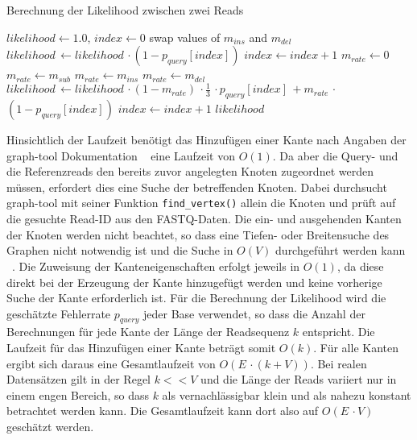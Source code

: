 \begin{algorithm}[H]
	\caption{Berechnung der Likelihood zwischen zwei Reads}  \label{alg:lh_read}
	\begin{algorithmic}[1]	
		\State $ likelihood \gets 1.0 $, $ index \gets 0 $
		    \State swap values of $ m_{ins} $ and $ m_{del} $
	    \EndIf
		        \State $ likelihood\, \gets likelihood \,\cdotp (1-p_{query}[index]) $
		    	\State $ index \gets index + 1 $
		    \EndWhile
	    \EndIf
	        \State $ m_{rate} \gets 0 $
	            \State $ m_{rate} \gets m_{sub} $
	        \EndIf
	            \State $ m_{rate} \gets m_{ins} $
	        \EndIf
	            \State $ m_{rate} \gets m_{del} $
	        \EndIf
		        \State $ likelihood\, \gets likelihood \,\cdotp (1 - m_{rate})\,\cdotp \frac{1}{3} \,\cdotp p_{query}[index] \, +  m_{rate}\,\cdotp $         
		         \State \hspace{63pt}  $ (1 - p_{query}[index]) $ 		        
		        \State $ index \gets index + 1 $
	        \EndWhile
	    \EndIf
		\EndFor
		\State \Return $likelihood$
		\EndFunction		
	\end{algorithmic}
\end{algorithm}

Hinsichtlich der Laufzeit benötigt das Hinzufügen einer Kante nach Angaben der graph-tool Dokumentation ~\cite{docs_graph_tool} eine Laufzeit von $ O(1) $. Da aber die Query- und die Referenzreads den bereits zuvor angelegten Knoten zugeordnet werden müssen, erfordert dies eine Suche der betreffenden Knoten. Dabei durchsucht graph-tool mit seiner Funktion \lstinline|find_vertex()| allein die Knoten und prüft auf die gesuchte Read-ID aus den FASTQ-Daten. Die ein- und ausgehenden Kanten der Knoten werden nicht beachtet, so dass eine Tiefen- oder Breitensuche des Graphen nicht notwendig ist und die Suche in $ O(V) $ durchgeführt werden kann ~\cite{graph_tool_coplexity_find_vertex}. Die Zuweisung der Kanteneigenschaften erfolgt jeweils in $ O(1) $, da diese direkt bei der Erzeugung der Kante hinzugefügt werden und keine vorherige Suche der Kante erforderlich ist. Für die Berechnung der Likelihood wird die geschätzte Fehlerrate $ p_{query} $ jeder Base verwendet, so dass die Anzahl der Berechnungen für jede Kante der Länge der Readsequenz $ k $ entspricht. Die Laufzeit für das Hinzufügen einer Kante beträgt somit $ O(k) $. Für alle Kanten ergibt sich daraus eine Gesamtlaufzeit von $ O(E\, \cdotp (k + V)) $. Bei realen Datensätzen gilt in der Regel $ k << V $ und die Länge der Reads variiert nur in einem engen Bereich, so dass $ k $ als vernachlässigbar klein und als nahezu konstant betrachtet werden kann. Die Gesamtlaufzeit kann dort also auf $ O(E\, \cdotp V) $ geschätzt werden. \\

